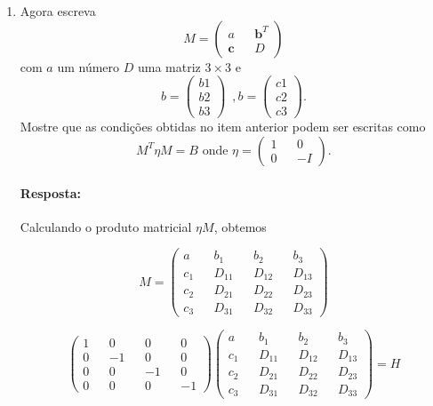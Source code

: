 \documentclass[10pt,a4paper]{article}
\begin{document}
\begin{enumerate}
	\item Agora escreva
	\begin{equation}\nonumber
		M =\left(\begin{matrix}
			a && \mathbf{b}^{T} \\
			\mathbf{c} && D
		\end{matrix}\right)
	\end{equation}
com $ a $ um número $ D $ uma matriz $ 3 \times 3 $ e
\begin{equation}\nonumber
	b = \left(\begin{matrix}
		b1 \\
		b2 \\
		b3
	\end{matrix}\right) \,\,\, ,	b = \left(\begin{matrix}
	c1 \\
	c2 \\
	c3
\end{matrix}\right).
\end{equation}
Mostre que as condições obtidas no item anterior podem ser escritas como
\begin{equation}\nonumber
	M^T\eta M = B \text{   onde } \eta = \left( \begin{matrix}
		1 && 0 \\
		0 && -I
	\end{matrix}\right).
\end{equation}
\paragraph{Resposta:}
Calculando o produto matricial $ \eta M $, obtemos

\begin{equation}\nonumber
	M = \left(\begin{matrix}
		a && b_1 && b_2 && b_3 \\
		c_1 && D_{11} && D_{12} && D_{13} \\
		c_2 && D_{21} && D_{22} && D_{23}\\
		c_3 && D_{31} && D_{32} && D_{33}
	\end{matrix}\right) 
\end{equation}

\begin{equation}\nonumber
	\left(\begin{matrix}
		1 && 0 && 0 && 0 \\
		0 && -1 && 0 && 0 \\
		0 && 0 && -1 && 0 \\
		0 && 0 && 0 && -1
	\end{matrix}\right)
	\left(\begin{matrix}
		a && b_1 && b_2 && b_3 \\
		c_1 && D_{11} && D_{12} && D_{13} \\
		c_2 && D_{21} && D_{22} && D_{23}\\
		c_3 && D_{31} && D_{32} && D_{33}
	\end{matrix}\right) = H
\end{equation}


\end{enumerate}
\end{document}
